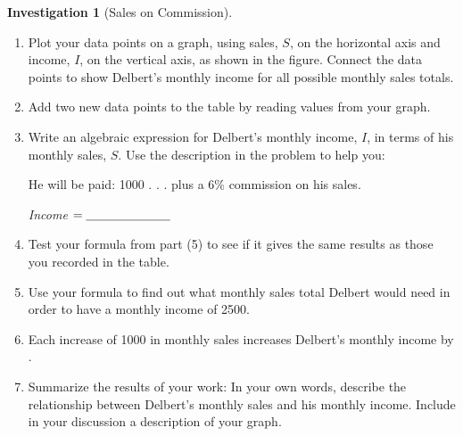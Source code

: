 \documentclass[10pt,]{book}
\newcommand{\fillin}[1]{\underline{\hspace{#1em}}}
\theoremstyle{plain}
\theoremstyle{definition}
\theoremstyle{definition}
\theoremstyle{definition}
\newtheorem{investigation}[project]{Investigation}
\theoremstyle{definition}
\numberwithin{equation}{part}
\newlength{\panelmax}
\begin{document}
\begin{investigation}[Sales on Commission]
\begin{enumerate}
{{}
\newlength{\phCimage}\setlength{\phCimage}{\ht\panelboxCimage+\dp\panelboxCimage}
\settototalheight{\phCimage}{\usebox{\panelboxCimage}}
\setlength{\panelmax}{\maxof{\panelmax}{\phCimage}}
\leavevmode%
\setlength{\tabcolsep}{0\textwidth}
\begin{figure}
\begin{tabular}{@{}*{2}{c}@{}}
\begin{minipage}[c][\panelmax][t]{0.5\textwidth}\usebox{\panelboxAtabular}\end{minipage}&
\begin{minipage}[c][\panelmax][t]{0.5\textwidth}\usebox{\panelboxCimage}\end{minipage}\end{tabular}
\end{figure}
}%
\item\hypertarget{li-3}{}Plot your data points on a graph, using sales, \(S\), on the horizontal axis and income, \(I\), on the vertical axis, as shown in the figure. Connect the data points to show Delbert’s monthly income for all possible monthly sales totals.%
\item\hypertarget{li-4}{}Add two new data points to the table by reading values from your graph.%
\item\hypertarget{li-5}{}Write an algebraic expression for Delbert’s monthly income, \(I\), in terms of his monthly sales, \(S\). Use the description in the problem to help you:%
\par
He will be paid: \textdollar{}1000 . . . plus a 6\% commission on his sales.%
\par
\emph{Income} \(= \fillin{6.818181818181818}\)%
\item\hypertarget{li-6}{}Test your formula from part (5) to see if it gives the same results as those you recorded in the table.%
\item\hypertarget{li-7}{}Use your formula to find out what monthly sales total Delbert would need in order to have a monthly income of \textdollar{}2500.%
\item\hypertarget{li-8}{}Each increase of \textdollar{}1000 in monthly sales increases Delbert’s monthly income by \fillin{6.818181818181818}.%
\item\hypertarget{li-9}{}Summarize the results of your work: In your own words, describe the relationship between Delbert’s monthly sales and his monthly income. Include in your discussion a description of your graph.%
\end{enumerate}
%
\end{investigation}
\typeout{************************************************}
\typeout{************************************************}
\end{document}
